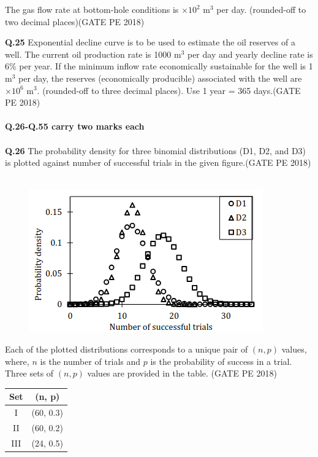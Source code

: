 \documentclass[journal,12pt,onecolumn]{IEEEtran}
\theoremstyle{remark}
\begin{document}
\vspace{0.2cm}
The gas flow rate at bottom-hole conditions is \underline{\hspace{1.5cm}} $\times 10^2$ m$^3$ per day. (rounded-off to two decimal places)\hfill(GATE PE 2018)

\pagebreak

\noindent\textbf{Q.25} Exponential decline curve is to be used to estimate the oil reserves of a well. The current oil production rate is 1000 m$^3$ per day and yearly decline rate is 6\% per year. If the minimum inflow rate economically sustainable for the well is 1 m$^3$ per day, the reserves (economically producible) associated with the well are \underline{\hspace{2cm}} $\times 10^6$ m$^3$. (rounded-off to three decimal places). Use 1 year = 365 days.\hfill(GATE PE 2018)\\\\

\noindent
{\large \textbf{Q.26-Q.55 carry two marks each}}\\\\

\noindent
\textbf{Q.26} The probability density for three binomial distributions (D1, D2, and D3) is plotted against
number of successful trials in the given figure.\hfill(GATE PE 2018)\\\\


\begin{figure}[h!]
  \centering
  \includegraphics[width=0.5\columnwidth]{pic8.png} 
\end{figure}

Each of the plotted distributions corresponds to a unique pair of $(n, p)$ values, where, $n$ is the number of trials and $p$ is the probability of success in a trial. Three sets of $(n, p)$ values are provided in the table.
\hfill (GATE PE 2018)

\begin{center}
\begin{tabular}{|c|c|}
\hline
Set & (n, p) \\
\hline
I & (60, 0.3) \\
II & (60, 0.2) \\
III & (24, 0.5) \\
\hline
\end{tabular}
\end{center}
\end{document}
